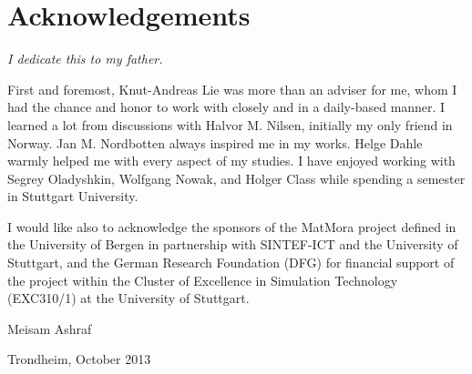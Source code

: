 \chapter{Acknowledgements}

\textit{\small{I dedicate this to my father.}} 

\vspace{1cm}

First and foremost, Knut-Andreas Lie was more than an adviser for me, whom I had
the chance and honor to work with closely and in a daily-based manner. I learned
a lot from discussions with Halvor M. Nilsen, initially my only friend in
Norway. Jan M. Nordbotten always inspired me in my works. Helge Dahle warmly helped me with every aspect of my studies. I have enjoyed working with Segrey Oladyshkin, Wolfgang Nowak, and Holger Class while spending a semester in Stuttgart University.

I would like also to acknowledge the sponsors of the MatMora project defined in the University of Bergen in partnership with SINTEF-ICT and the University of Stuttgart, and the German Research Foundation (DFG) for financial support of the project within the Cluster of Excellence in Simulation Technology (EXC310/1) at the University of Stuttgart.


\vspace{2cm}
\hspace{10cm}
Meisam Ashraf

\hspace{10cm}
Trondheim, October 2013 








